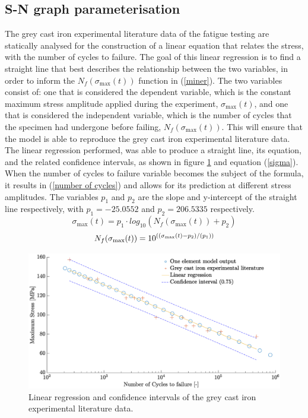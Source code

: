 \documentclass[11pt,a4paper]{article}
\begin{document}
\subsection{S-N graph parameterisation}
\label{S-N analysis}
The grey cast iron experimental literature data of the fatigue testing are statically analysed for the construction of a linear equation that relates the stress, with the number of cycles to failure. The goal of this linear regression is to find a straight line that best describes the relationship between the two variables, in order to inform the $N_f(\sigma_{\textrm{max}}(t))$ function in (\ref{miner}). The two variables consist of: one that is considered the dependent variable, which is the constant maximum stress amplitude applied during the experiment, $\sigma_{\textrm{max}}(t)$, and one that is considered the independent variable, which is the number of cycles that the specimen had undergone before failing, $N_f(\sigma_{\textrm{max}}(t))$. This will ensure that the model is able to reproduce the grey cast iron experimental literature data. The linear regression performed, was able to produce a straight line, its equation, and the related confidence intervals, as shown in figure \ref{regression} and equation (\ref{sigma}). When the number of cycles to failure variable becomes the subject of the formula, it results in (\ref{number of cycles}) and allows for its prediction at different stress amplitudes. The variables $p_1$ and $p_2$ are the slope and y-intercept of the straight line respectively, with $p_1=-25.0552$ and $p_2=206.5335$ respectively.
\begin{equation}
\sigma_{\textrm{max}}(t) = p_1\cdot log_{10}(N_f(\sigma_{\textrm{max}}(t))+p_2)
\label{sigma}
\end{equation}
\begin{equation}
N_f(\sigma_{\textrm{max}}(t)) = 10^{((\sigma_{\textrm{\tiny{max}}}(t)-p_2)/(p_1))}
\label{number of cycles}
\end{equation}
\begin{figure} [ht]
\centering
\includegraphics[width = 17cm]{Linear_regression.eps}
\caption{Linear regression and confidence intervals of the grey cast iron experimental literature data.}
\label{regression}
\end{figure}
\end{document}
